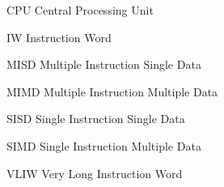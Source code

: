 \begin{siglas}
        \item[CPU] Central Processing Unit

        \item[IW] Instruction Word 

        \item[MISD] Multiple Instruction Single Data
        \item[MIMD] Multiple Instruction Multiple Data

        \item[SISD] Single Instruction Single Data
        \item[SIMD] Single Instruction Multiple Data

        \item[VLIW] Very Long Instruction Word
\end{siglas}
